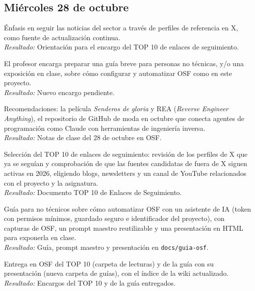 \documentclass[11pt,a4paper]{article}
\newcommand{\actividad}[3]{\item[\textbf{[#1]}] #2 \\ \textit{Resultado:} #3}
\begin{document}
	\subsection*{Miércoles 28 de octubre}
	\begin{description}[leftmargin=0pt, itemsep=6pt]
		\actividad{Clase}{Énfasis en seguir las noticias del sector a través de perfiles de referencia en X, como fuente de actualización continua.}{Orientación para el encargo del TOP 10 de enlaces de seguimiento.}
		\actividad{Clase}{El profesor encarga preparar una guía breve para personas no técnicas, y/o una exposición en clase, sobre cómo configurar y automatizar OSF como en este proyecto.}{Nuevo encargo pendiente.}
		\actividad{Clase}{Recomendaciones: la película \textit{Senderos de gloria} y REA (\textit{Reverse Engineer Anything}), el repositorio de GitHub de moda en octubre que conecta agentes de programación como Claude con herramientas de ingeniería inversa.}{Notas de clase del 28 de octubre en OSF.}
		\actividad{Investigación}{Selección del TOP 10 de enlaces de seguimiento: revisión de los perfiles de X que ya se seguían y comprobación de que las fuentes candidatas de fuera de X siguen activas en 2026, eligiendo blogs, newsletters y un canal de YouTube relacionados con el proyecto y la asignatura.}{Documento TOP 10 de Enlaces de Seguimiento.}
		\actividad{Documentación}{Guía para no técnicos sobre cómo automatizar OSF con un asistente de IA (token con permisos mínimos, guardado seguro e identificador del proyecto), con capturas de OSF, un prompt maestro reutilizable y una presentación en HTML para exponerla en clase.}{Guía, prompt maestro y presentación en \texttt{docs/guia-osf}.}
		\actividad{Tarea}{Entrega en OSF del TOP 10 (carpeta de lecturas) y de la guía con su presentación (nueva carpeta de guías), con el índice de la wiki actualizado.}{Encargos del TOP 10 y de la guía entregados.}
	\end{description}
\end{document}
